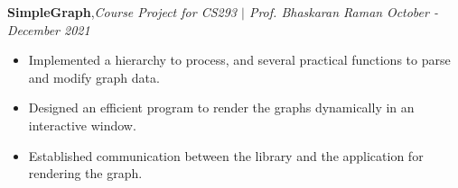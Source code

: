 \textbf{SimpleGraph}\sep{\it Course Project for CS293 $|$ Prof. Bhaskaran Raman} \hfill {\sl \small October - December 2021}\\
\vspace{-5pt}
\begin{itemize}[itemsep = -1.3 mm, leftmargin=*]
\item Implemented a hierarchy to process, and several practical functions to parse and modify graph data.
\item Designed an efficient program to render the graphs dynamically in an interactive window.
\item Established communication between the library and the application for rendering the graph.
\end{itemize}
